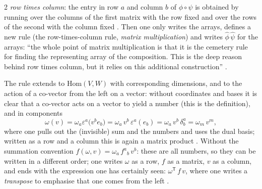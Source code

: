 \begin{paracol}{2}
\emph{row times column}: the entry in row $a$ and column $b$ of $\phi\circ\psi$ is obtained by running over the columns of the first matrix with the row fixed and over the rows of the second with the column fixed .
Then one only writes the arrays, defines a new rule (the row-times-column rule, \emph{matrix multiplication}) and writes $\hat\phi\,\hat\psi$ for the arrays: ``the whole point of matrix multiplication is that it is the cemetery rule for finding the representing array of the composition. This is the deep reason behind row times column, but it relies on this
additional construction'' .

The rule extends to $\mathrm{Hom}(V,W)$ with corresponding dimensions, and to the action of a co-vector from the left on a vector: without coordinates and bases it is clear that a co-vector acts on a vector to yield a number (this is the definition), and in components
\[
  \omega(v)=\omega_a\varepsilon^a\bigl(v^be_b\bigr)=\omega_a\,v^b\,\varepsilon^a(e_b)=\omega_a\,v^b\,\delta^a_b=\omega_m\,v^m,
\]
where one pulls out the (invisible) sum and the numbers and uses the dual basis; written as a row and a column this is again a matrix product .
Without the summation convention $f(\omega,v)=\omega_a\,f^a{}_b\,v^b$: these are all numbers, so they can be written in a different order; one writes $\omega$ as a row, $f$ as a matrix, $v$ as a column, and ends with the expression one has certainly seen: $\omega^{\mathsf T}\,f\,v$, where one writes a \emph{transpose} to emphasise that one comes from the left .


\end{paracol}
